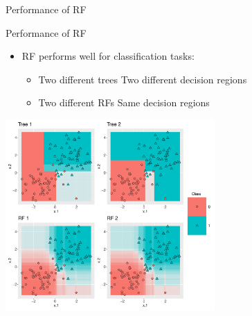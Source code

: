 \documentclass[11pt,compress,t,notes=noshow, xcolor=table]{beamer}
\begin{document}
\begin{vbframe}{Performance of RF}
\end{vbframe}

\begin{vbframe}{Performance of RF}
\begin{itemize}
    \begin{itemize}
        \item \small RF performs well for classification tasks:
        \begin{itemize}
            \item \small Two different trees \textrightarrow Two different decision regions
            \item \small Two different RFs \textrightarrow Same decision regions
        \end{itemize}
    \end{itemize}
\begin{center}
 \includegraphics[width = 0.6\textwidth]{figure/nutshell_classif_combined_1.pdf}
\end{center}
\end{itemize}



\end{vbframe}
\end{document}

